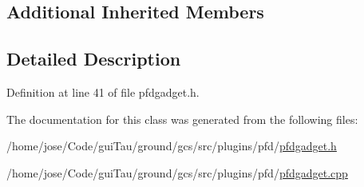 \subsection*{Additional Inherited Members}


\subsection{Detailed Description}


Definition at line 41 of file pfdgadget.\-h.



The documentation for this class was generated from the following files\-:\begin{DoxyCompactItemize}
\item 
/home/jose/\-Code/gui\-Tau/ground/gcs/src/plugins/pfd/\hyperlink{pfdgadget_8h}{pfdgadget.\-h}\item 
/home/jose/\-Code/gui\-Tau/ground/gcs/src/plugins/pfd/\hyperlink{pfdgadget_8cpp}{pfdgadget.\-cpp}\end{DoxyCompactItemize}
